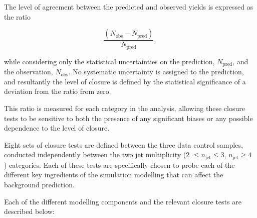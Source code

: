 The level of agreement between the predicted and observed yields is expressed as the ratio 

\begin{equation}
\label{eq:closuretests}
\frac{(N_{\text{obs}}-N_{\text{pred}})}{N_{\text{pred}}},
\end{equation}

while considering only the statistical uncertainties on the prediction, $N_{\text{pred}}$,  and the observation, $N_{\text{obs}}$. No systematic uncertainty is assigned to the prediction, and resultantly the level of closure is defined by the statistical significance of a deviation from the ratio from zero.

This ratio is measured for each \theht category in the analysis, allowing these closure tests to be sensitive to both the presence of any significant biases or any possible \theht dependence to the level of closure.

Eight sets of closure tests are defined between the three data control samples, conducted independently between the two jet multiplicity (2 $\leq n_{\text{jet}} \leq 3$, $n_{\text{jet}} \geq 4$ ) categories. Each of these tests are specifically chosen to probe each of the different key ingredients of the simulation modelling that can affect the background prediction.

Each of the different modelling components and the relevant closure tests are described below:

